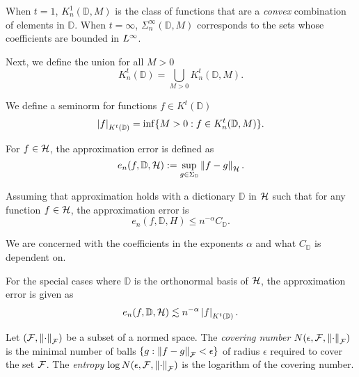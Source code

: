 When $t = 1$, $K^1_n(\mathbb{D}, M)$ is the class of functions that are a
\textit{convex} combination of elements in $\mathbb{D}$. When $t = \infty$,
$\Sigma^{\infty}_n(\mathbb{D}, M)$ corresponds to the sets whose coefficients
are bounded in $L^{\infty}$. 

Next, we define the union for all $M > 0$
\begin{equation}
    K^t_n(\mathbb{D}) = \bigcup_{M > 0} K^t_n(\mathbb{D}, M).
\end{equation}

We define a seminorm for functions $f \in K^t(\mathbb{D})$
\begin{equation}
    \label{eq:general_seminorm}
    \left| f \right|_{K^t(\mathbb{D})} = \inf \{
        M >0: f \in K^t_n(\mathbb{D}, M)
    \}.
\end{equation}

For $f \in \mathcal{H}$, the approximation error is defined as
\begin{equation}
    \label{eq:appro_err_hilbert}
    e_n(f, \mathbb{D}, \mathcal{H})
        := \sup_{g\in\Sigma_{\mathbb{D}}} \left\| f - g \right\|_{\mathcal{H}}.
\end{equation}

Assuming that approximation holds with a dictionary $\mathbb{D}$ in $\mathcal{H}$
such that for any function $f \in \mathcal{H}$, the approximation error is
\begin{equation}
    \label{eq:appro_error_general}
    e_n(f, \mathbb{D}, H) \leq n^{-\alpha} C_{\mathbb{D}}.
\end{equation}

We are concerned with the coefficients in the exponents $\alpha$ and what
$C_{\mathbb{D}}$ is dependent on.

For the special cases where $\mathbb{D}$ is the orthonormal basis of $\mathcal{H}$,
the approximation error is given as
\begin{equation}
    \label{eq:appro_error_ortho}
    e_n(f, \mathbb{D}, \mathcal{H}) 
        \lesssim n^{-\alpha} \left| f \right|_{K^t(\mathbb{D})}.
\end{equation}

\begin{definition}
    \label{def:covering_num}
    Let $(\mathcal{F}, \left\| \cdot \right\|_{\mathcal{F}})$ be a subset of a normed space. The
    \textit{covering number} $N(\epsilon, \mathcal{F}, \left\| \cdot \right\|_{\mathcal{F}})$ is
    the minimal number of balls $\{g: \left\| f - g \right\|_{\mathcal{F}} < \epsilon\}$ of
    radius $\epsilon$ required to cover the set $\mathcal{F}$. The \textit{entropy}
    $\log N(\epsilon, \mathcal{F}, \left\| \cdot \right\|_{\mathcal{F}})$ is the logarithm of
    the covering number.
\end{definition}

